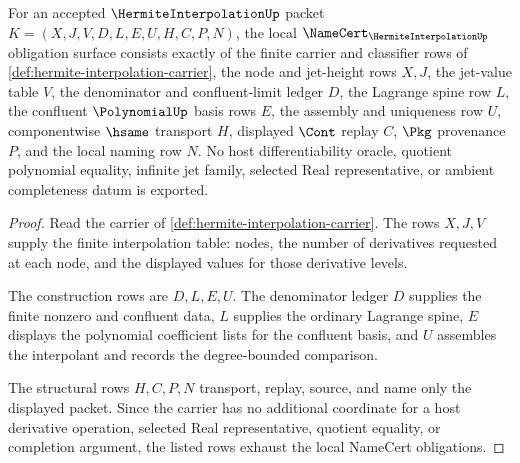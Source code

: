 \begin{theorem}
\label{thm:hermite-interpolation-namecert-obligations}
For an accepted $\HermiteInterpolationUp$ packet $K=(X,J,V,D,L,E,U,H,C,P,N)$, the local $\NameCert_{\HermiteInterpolationUp}$ obligation surface consists exactly of the finite carrier and classifier rows of \autoref{def:hermite-interpolation-carrier}, the node and jet-height rows $X,J$, the jet-value table $V$, the denominator and confluent-limit ledger $D$, the Lagrange spine row $L$, the confluent $\PolynomialUp$ basis rows $E$, the assembly and uniqueness row $U$, componentwise $\hsame$ transport $H$, displayed $\Cont$ replay $C$, $\Pkg$ provenance $P$, and the local naming row $N$. No host differentiability oracle, quotient polynomial equality, infinite jet family, selected Real representative, or ambient completeness datum is exported.
\end{theorem}
\begin{proof}
Read the carrier of \autoref{def:hermite-interpolation-carrier}. The rows $X,J,V$ supply the finite interpolation table: nodes, the number of derivatives requested at each node, and the displayed values for those derivative levels.

The construction rows are $D,L,E,U$. The denominator ledger $D$ supplies the finite nonzero and confluent data, $L$ supplies the ordinary Lagrange spine, $E$ displays the polynomial coefficient lists for the confluent basis, and $U$ assembles the interpolant and records the degree-bounded comparison.

The structural rows $H,C,P,N$ transport, replay, source, and name only the displayed packet. Since the carrier has no additional coordinate for a host derivative operation, selected Real representative, quotient equality, or completion argument, the listed rows exhaust the local NameCert obligations.
\end{proof}

